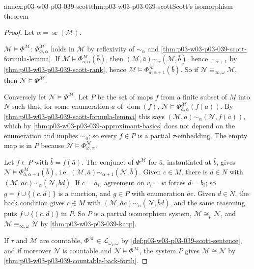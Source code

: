 \begin{annexitem}{annex:p03-w03-p03-039-scott}{thm:p03-w03-p03-039-scott}{Scott's isomorphism theorem}
\begin{proof}
Let \(\alpha=\operatorname{sr}(\mathcal M)\).

\(\mathcal M\models\Phi^{\mathcal M}\): \(\Phi^{\mathcal M}_{\varnothing,\alpha}\)
holds in \(\mathcal M\) by reflexivity of \(\sim_\alpha\) and
\cref{thm:p03-w03-p03-039-scott-formula-lemma}. If
\(\mathcal M\models\Phi^{\mathcal M}_{\bar a,\alpha}(\bar b)\), then
\((\mathcal M,\bar a)\sim_\alpha(\mathcal M,\bar b)\), hence
\(\sim_{\alpha+1}\) by \cref{thm:p03-w03-p03-039-scott-rank}, hence
\(\mathcal M\models\Phi^{\mathcal M}_{\bar a,\alpha+1}(\bar b)\). So if
\(\mathcal N\equiv_{\infty,\omega}\mathcal M\), then
\(\mathcal N\models\Phi^{\mathcal M}\).

Conversely let \(\mathcal N\models\Phi^{\mathcal M}\). Let \(P\) be the set of
maps \(f\) from a finite subset of \(M\) into \(N\) such that, for some
enumeration \(\bar a\) of \(\operatorname{dom}(f)\),
\(\mathcal N\models\Phi^{\mathcal M}_{\bar a,\alpha}(f(\bar a))\). By
\cref{thm:p03-w03-p03-039-scott-formula-lemma} this says
\((\mathcal M,\bar a)\sim_\alpha(\mathcal N,f(\bar a))\), which by
\cref{thm:p03-w03-p03-039-approximant-basics} does not depend on the
enumeration and implies \(\sim_0\); so every \(f\in P\) is a partial
\(\tau\)-embedding. The empty map is in \(P\) because \(\mathcal N\models\Phi^{\mathcal M}_{\varnothing,\alpha}\).

Let \(f\in P\) with \(\bar b=f(\bar a)\). The conjunct of \(\Phi^{\mathcal M}\)
for \(\bar a\), instantiated at \(\bar b\), gives
\(\mathcal N\models\Phi^{\mathcal M}_{\bar a,\alpha+1}(\bar b)\), i.e.
\((\mathcal M,\bar a)\sim_{\alpha+1}(\mathcal N,\bar b)\). Given \(c\in M\),
there is \(d\in N\) with \((\mathcal M,\bar ac)\sim_\alpha(\mathcal N,\bar bd)\).
If \(c=a_i\), agreement on \(v_i=w\) forces \(d=b_i\); so
\(g=f\cup\{(c,d)\}\) is a function, and \(g\in P\) with enumeration
\(\bar ac\). Given \(d\in N\), the back condition gives \(c\in M\) with
\((\mathcal M,\bar ac)\sim_\alpha(\mathcal N,\bar bd)\), and the same
reasoning puts \(f\cup\{(c,d)\}\) in \(P\). So \(P\) is a partial
isomorphism system, \(\mathcal M\cong_p\mathcal N\), and
\(\mathcal M\equiv_{\infty,\omega}\mathcal N\) by
\cref{thm:p03-w03-p03-039-karp}.

If \(\tau\) and \(\mathcal M\) are countable, \(\Phi^{\mathcal M}\in\mathcal L_{\omega_1,\omega}\)
by \cref{def:p03-w03-p03-039-scott-sentence}, and if moreover \(\mathcal N\)
is countable and \(\mathcal N\models\Phi^{\mathcal M}\), the system \(P\)
gives \(\mathcal M\cong\mathcal N\) by
\cref{thm:p03-w03-p03-039-countable-back-forth}.
\end{proof}
\end{annexitem}

